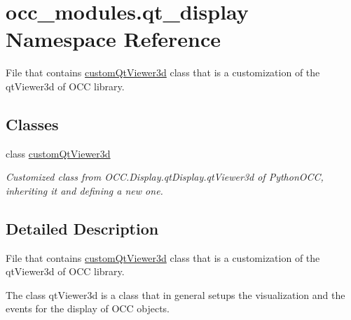 \hypertarget{a00055}{}\section{occ\+\_\+modules.\+qt\+\_\+display Namespace Reference}
\label{a00055}


File that contains \hyperlink{a00090}{custom\+Qt\+Viewer3d} class that is a customization of the qt\+Viewer3d of O\+CC library.  


\subsection*{Classes}
\begin{DoxyCompactItemize}
\item 
class \hyperlink{a00090}{custom\+Qt\+Viewer3d}
\begin{DoxyCompactList}\small\item\em Customized class from O\+C\+C.\+Display.\+qt\+Display.\+qt\+Viewer3d of Python\+O\+CC, inheriting it and defining a new one. \end{DoxyCompactList}\end{DoxyCompactItemize}


\subsection{Detailed Description}
File that contains \hyperlink{a00090}{custom\+Qt\+Viewer3d} class that is a customization of the qt\+Viewer3d of O\+CC library. 

The class qt\+Viewer3d is a class that in general setups the visualization and the events for the display of O\+CC objects. 